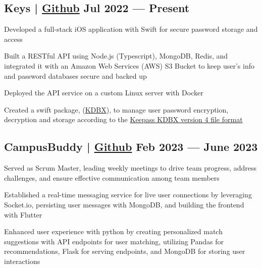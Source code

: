 \subsection{{Keys | \href{https://github.com/jerikjakobsen/keys}{Github} \hfill Jul 2022 --- Present}}
\begin{zitemize}
\item Developed a full-stack iOS application with Swift for secure password storage and access
\item Built a RESTful API using Node.js (Typescript), MongoDB, Redis, and integrated it with an Amazon Web Services (AWS) S3 Bucket to keep user's info and password databases secure and backed up
\item Deployed the API service on a custom Linux server with Docker
\item Created a swift package, (\href{https://github.com/jerikjakobsen/kdbx}{KDBX}), to manage user password encryption, decryption and storage according to the  \href{https://keepass.info/help/kb/kdbx_4.html}{Keepass KDBX version 4 file format}
\end{zitemize}

\subsection{{CampusBuddy | \href{https://github.com/pegliang/CampusBuddy}{Github} \hfill Feb 2023 --- June 2023}}
\begin{zitemize}
\item Served as Scrum Master, leading weekly meetings to drive team progress, address challenges, and ensure effective communication among team members
\item Established a real-time messaging service for live user connections by leveraging Socket.io, persisting user messages with MongoDB, and building the frontend with Flutter
\item Enhanced user experience with python by creating personalized match suggestions with API endpoints for user matching, utilizing Pandas for recommendations, Flask for serving endpoints, and MongoDB for storing user interactions
\end{zitemize}

